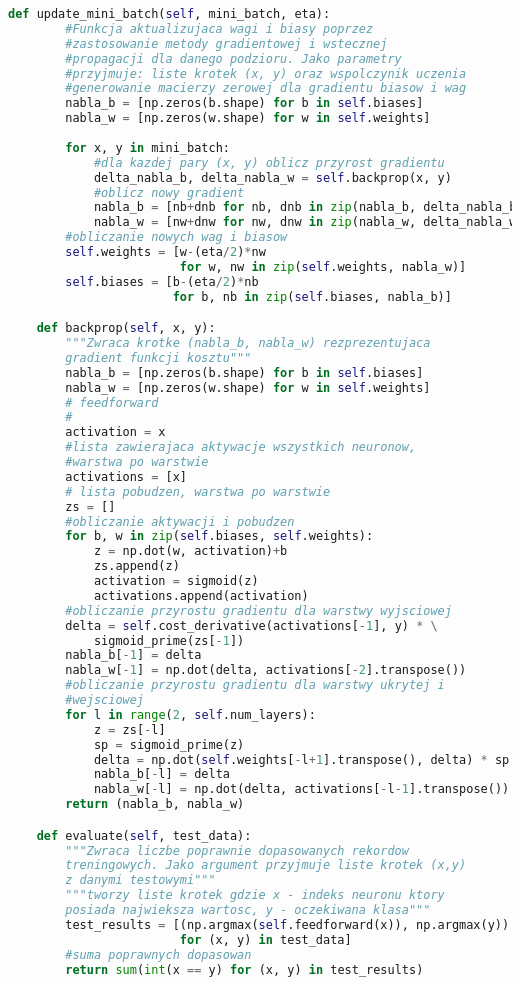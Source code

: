\documentclass[12pt,twoside]{article}
\begin{document}
\begin{lstlisting}[language=Python,caption=Algorytm uczenia sieci,label={Kod2}]
    def update_mini_batch(self, mini_batch, eta):
        #Funkcja aktualizujaca wagi i biasy poprzez 
        #zastosowanie metody gradientowej i wstecznej 
        #propagacji dla danego podzioru. Jako parametry 
        #przyjmuje: liste krotek (x, y) oraz wspolczynik uczenia
        #generowanie macierzy zerowej dla gradientu biasow i wag
        nabla_b = [np.zeros(b.shape) for b in self.biases]
        nabla_w = [np.zeros(w.shape) for w in self.weights]
        
        for x, y in mini_batch:
            #dla kazdej pary (x, y) oblicz przyrost gradientu
            delta_nabla_b, delta_nabla_w = self.backprop(x, y)
            #oblicz nowy gradient
            nabla_b = [nb+dnb for nb, dnb in zip(nabla_b, delta_nabla_b)]
            nabla_w = [nw+dnw for nw, dnw in zip(nabla_w, delta_nabla_w)]
        #obliczanie nowych wag i biasow
        self.weights = [w-(eta/2)*nw
                        for w, nw in zip(self.weights, nabla_w)]
        self.biases = [b-(eta/2)*nb
                       for b, nb in zip(self.biases, nabla_b)]

    def backprop(self, x, y):
        """Zwraca krotke (nabla_b, nabla_w) rezprezentujaca 
        gradient funkcji kosztu"""
        nabla_b = [np.zeros(b.shape) for b in self.biases]
        nabla_w = [np.zeros(w.shape) for w in self.weights]
        # feedforward
        #
        activation = x
        #lista zawierajaca aktywacje wszystkich neuronow, 
        #warstwa po warstwie
        activations = [x]
        # lista pobudzen, warstwa po warstwie
        zs = []
        #obliczanie aktywacji i pobudzen
        for b, w in zip(self.biases, self.weights):
            z = np.dot(w, activation)+b
            zs.append(z)
            activation = sigmoid(z)
            activations.append(activation)
        #obliczanie przyrostu gradientu dla warstwy wyjsciowej
        delta = self.cost_derivative(activations[-1], y) * \
            sigmoid_prime(zs[-1])
        nabla_b[-1] = delta
        nabla_w[-1] = np.dot(delta, activations[-2].transpose())
        #obliczanie przyrostu gradientu dla warstwy ukrytej i 
        #wejsciowej
        for l in range(2, self.num_layers):
            z = zs[-l]
            sp = sigmoid_prime(z)
            delta = np.dot(self.weights[-l+1].transpose(), delta) * sp
            nabla_b[-l] = delta
            nabla_w[-l] = np.dot(delta, activations[-l-1].transpose())
        return (nabla_b, nabla_w)

    def evaluate(self, test_data):
        """Zwraca liczbe poprawnie dopasowanych rekordow 
        treningowych. Jako argument przyjmuje liste krotek (x,y) 
        z danymi testowymi"""
        """tworzy liste krotek gdzie x - indeks neuronu ktory 
        posiada najwieksza wartosc, y - oczekiwana klasa"""
        test_results = [(np.argmax(self.feedforward(x)), np.argmax(y))
                        for (x, y) in test_data]
        #suma poprawnych dopasowan
        return sum(int(x == y) for (x, y) in test_results)


\end{lstlisting}
\end{document}
